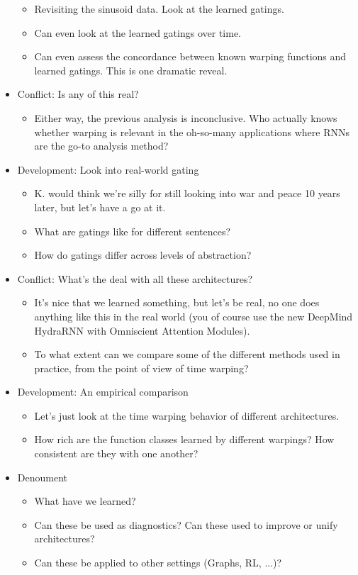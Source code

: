 \documentclass{article}
\begin{document}
\begin{itemize}
\begin{itemize}
  \item Revisiting the sinusoid data. Look at the learned gatings.
  \item Can even look at the learned gatings over time.
  \item Can even assess the concordance between known warping functions and
    learned gatings. This is one dramatic reveal.
  \end{itemize}
\item Conflict: Is any of this real?
  \begin{itemize}
  \item Either way, the previous analysis is inconclusive. Who actually knows
    whether warping is relevant in the oh-so-many applications where RNNs are
    the go-to analysis method?
  \end{itemize}
\item Development: Look into real-world gating
  \begin{itemize}
  \item K. would think we're silly for still looking into war and peace 10 years
    later, but let's have a go at it.
  \item What are gatings like for different sentences?
  \item How do gatings differ across levels of abstraction?
  \end{itemize}
\item Conflict: What's the deal with all these architectures?
  \begin{itemize}
  \item It's nice that we learned something, but let's be real, no one does
    anything like this in the real world (you of course use the new DeepMind
    HydraRNN with Omniscient Attention Modules).
  \item To what extent can we compare some of the different methods used in
    practice, from the point of view of time warping?
  \end{itemize}
\item Development: An empirical comparison
  \begin{itemize}
  \item Let's just look at the time warping behavior of different architectures.
  \item How rich are the function classes learned by different warpings? How
    consistent are they with one another?
  \end{itemize}
\item Denoument
  \begin{itemize}
  \item What have we learned?
  \item Can these be used as diagnostics? Can these used to improve or unify
    architectures?
  \item Can these be applied to other settings (Graphs, RL, ...)?
  \end{itemize}
\end{itemize}
\end{document}
